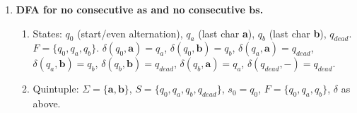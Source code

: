 \documentclass[11pt]{book}
\begin{document}
\begin{enumerate}[{1.}1.]
States: $q_0$ (no pending \textbf{b}), $q_b$ (last unresolved \textbf{b}), $q_{err}$ (dead). $F=\{q_0\}$.
$\delta(q_0,\mathbf{b})=q_b$, $\delta(q_0,\mathbf{a})=\delta(q_0,\mathbf{c})=q_0$,
$\delta(q_b,\mathbf{c})=q_0$, $\delta(q_b,\mathbf{b})=q_b$, $\delta(q_b,\mathbf{a})=q_b$.

Every \textbf{b} must be followed by a \textbf{c} at \emph{some} later position (not necessarily immediately). The machine tracks whether there is an outstanding \textbf{b} with no subsequent \textbf{c} yet. Reading \textbf{c} in state $q_b$ resolves all pending \textbf{b}s (returning to $q_0$); reading \textbf{a} or another \textbf{b} leaves the pending flag set. When input ends, reject if in $q_b$ (an unresolved \textbf{b} exists), accept if in $q_0$.

$q_0$: no unresolved \textbf{b} (final if EOS comes here),
$q_b$: at least one unresolved \textbf{b} (nonfinal at EOS).
$\delta(q_0,\mathbf{a})=q_0$, $\delta(q_0,\mathbf{b})=q_b$, $\delta(q_0,\mathbf{c})=q_0$,
$\delta(q_b,\mathbf{a})=q_b$, $\delta(q_b,\mathbf{b})=q_b$, $\delta(q_b,\mathbf{c})=q_0$.
$F=\{q_0\}$.

\item \textbf{DFA for no consecutive $\mathbf{a}$s and no consecutive $\mathbf{b}$s.}

\begin{enumerate}
\item States: $q_0$ (start/even alternation), $q_a$ (last char \textbf{a}), $q_b$ (last char \textbf{b}), $q_{dead}$. $F=\{q_0,q_a,q_b\}$.
$\delta(q_0,\mathbf{a})=q_a$, $\delta(q_0,\mathbf{b})=q_b$,
$\delta(q_a,\mathbf{a})=q_{dead}$, $\delta(q_a,\mathbf{b})=q_b$,
$\delta(q_b,\mathbf{b})=q_{dead}$, $\delta(q_b,\mathbf{a})=q_a$,
$\delta(q_{dead},-)=q_{dead}$.

\item Quintuple: $\Sigma=\{\mathbf{a},\mathbf{b}\}$, $S=\{q_0,q_a,q_b,q_{dead}\}$, $s_0=q_0$, $F=\{q_0,q_a,q_b\}$, $\delta$ as above.
\end{enumerate}

\end{enumerate}













\end{document}
